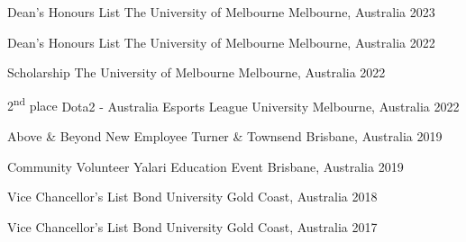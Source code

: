

\begin{cvhonors}

  \cvhonor
    {Dean’s Honours List} %
    {The University of Melbourne} %
    {Melbourne, Australia} %
    {2023} %

  \cvhonor
    {Dean’s Honours List} %
    {The University of Melbourne} %
    {Melbourne, Australia} %
    {2022} %

  \cvhonor
    {Scholarship} %
    {The University of Melbourne} %
    {Melbourne, Australia} %
    {2022} %

  \cvhonor
    {2\textsuperscript{nd} place} %
    {Dota2 - Australia Esports League University} %
    {Melbourne, Australia} %
    {2022} %

  \cvhonor
    {Above \& Beyond New Employee} %
    {Turner \& Townsend} %
    {Brisbane, Australia} %
    {2019} %

  \cvhonor
    {Community Volunteer} %
    {Yalari Education Event} %
    {Brisbane, Australia} %
    {2019 } %


  \cvhonor
    {Vice Chancellor's List} %
    {Bond University} %
    {Gold Coast, Australia} %
    {2018} %


  \cvhonor
    {Vice Chancellor's List} %
    {Bond University} %
    {Gold Coast, Australia} %
    {2017} %



\end{cvhonors}
